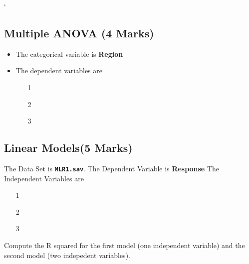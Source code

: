

`	%


\subsection{Multiple ANOVA (4 Marks)}
\begin{itemize}
\item The categorical variable is \textbf{Region}
\item The dependent variables are
\begin{itemize}
\item[1]
\item[2]
\item[3]
\end{itemize}
\end{itemize}
\subsection{Linear Models(5 Marks) }
The Data Set is \textbf{\texttt{MLR1.sav}}.
The Dependent Variable is \textbf{Response}
The Independent Variables are
\begin{itemize}
\item[1]
\item[2]
\item[3]
\end{itemize}
Compute the R squared for the first model (one independent variable) and the second model (two indepedent variables).
